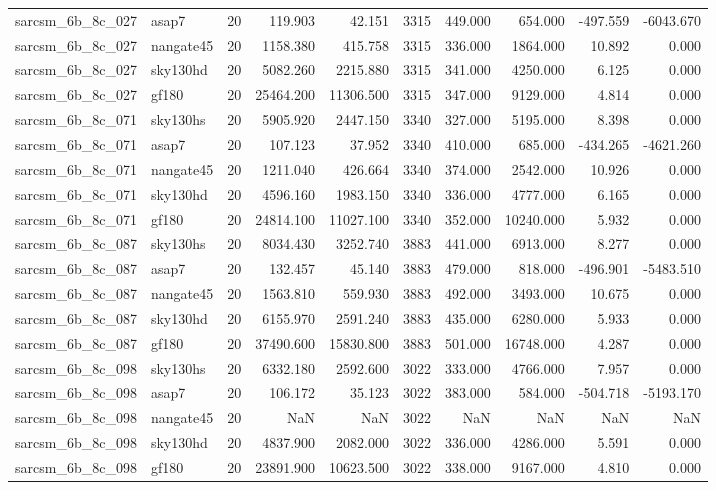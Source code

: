 \begin{longtable}{llrrrrrrrr}
sarcsm\_6b\_8c\_027 & asap7 & 20 & 119.903 & 42.151 & 3315 & 449.000 & 654.000 & -497.559 & -6043.670 \\
sarcsm\_6b\_8c\_027 & nangate45 & 20 & 1158.380 & 415.758 & 3315 & 336.000 & 1864.000 & 10.892 & 0.000 \\
sarcsm\_6b\_8c\_027 & sky130hd & 20 & 5082.260 & 2215.880 & 3315 & 341.000 & 4250.000 & 6.125 & 0.000 \\
sarcsm\_6b\_8c\_027 & gf180 & 20 & 25464.200 & 11306.500 & 3315 & 347.000 & 9129.000 & 4.814 & 0.000 \\
sarcsm\_6b\_8c\_071 & sky130hs & 20 & 5905.920 & 2447.150 & 3340 & 327.000 & 5195.000 & 8.398 & 0.000 \\
sarcsm\_6b\_8c\_071 & asap7 & 20 & 107.123 & 37.952 & 3340 & 410.000 & 685.000 & -434.265 & -4621.260 \\
sarcsm\_6b\_8c\_071 & nangate45 & 20 & 1211.040 & 426.664 & 3340 & 374.000 & 2542.000 & 10.926 & 0.000 \\
sarcsm\_6b\_8c\_071 & sky130hd & 20 & 4596.160 & 1983.150 & 3340 & 336.000 & 4777.000 & 6.165 & 0.000 \\
sarcsm\_6b\_8c\_071 & gf180 & 20 & 24814.100 & 11027.100 & 3340 & 352.000 & 10240.000 & 5.932 & 0.000 \\
sarcsm\_6b\_8c\_087 & sky130hs & 20 & 8034.430 & 3252.740 & 3883 & 441.000 & 6913.000 & 8.277 & 0.000 \\
sarcsm\_6b\_8c\_087 & asap7 & 20 & 132.457 & 45.140 & 3883 & 479.000 & 818.000 & -496.901 & -5483.510 \\
sarcsm\_6b\_8c\_087 & nangate45 & 20 & 1563.810 & 559.930 & 3883 & 492.000 & 3493.000 & 10.675 & 0.000 \\
sarcsm\_6b\_8c\_087 & sky130hd & 20 & 6155.970 & 2591.240 & 3883 & 435.000 & 6280.000 & 5.933 & 0.000 \\
sarcsm\_6b\_8c\_087 & gf180 & 20 & 37490.600 & 15830.800 & 3883 & 501.000 & 16748.000 & 4.287 & 0.000 \\
sarcsm\_6b\_8c\_098 & sky130hs & 20 & 6332.180 & 2592.600 & 3022 & 333.000 & 4766.000 & 7.957 & 0.000 \\
sarcsm\_6b\_8c\_098 & asap7 & 20 & 106.172 & 35.123 & 3022 & 383.000 & 584.000 & -504.718 & -5193.170 \\
sarcsm\_6b\_8c\_098 & nangate45 & 20 & NaN & NaN & 3022 & NaN & NaN & NaN & NaN \\
sarcsm\_6b\_8c\_098 & sky130hd & 20 & 4837.900 & 2082.000 & 3022 & 336.000 & 4286.000 & 5.591 & 0.000 \\
sarcsm\_6b\_8c\_098 & gf180 & 20 & 23891.900 & 10623.500 & 3022 & 338.000 & 9167.000 & 4.810 & 0.000 \\

\end{longtable}

